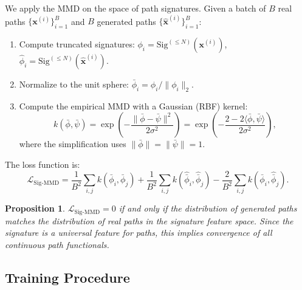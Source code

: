 \documentclass[11pt, a4paper]{article}
\newtheorem{proposition}[theorem]{Proposition}
\newcommand{\Sig}{\mathrm{Sig}}
\begin{document}
We apply the MMD on the space of path signatures. Given a batch of $B$ real paths $\{\mathbf{x}^{(i)}\}_{i=1}^B$ and $B$ generated paths $\{\hat{\mathbf{x}}^{(i)}\}_{i=1}^B$:

\begin{enumerate}[nosep]
    \item Compute truncated signatures: $\phi_i = \Sig^{(\leq N)}(\mathbf{x}^{(i)})$, $\hat{\phi}_i = \Sig^{(\leq N)}(\hat{\mathbf{x}}^{(i)})$.
    \item Normalize to the unit sphere: $\bar{\phi}_i = \phi_i / \|\phi_i\|_2$.  
    \item Compute the empirical MMD with a Gaussian (RBF) kernel:
    \begin{equation}
        k(\bar{\phi}, \bar{\psi}) = \exp\!\left(-\frac{\|\bar{\phi} - \bar{\psi}\|^2}{2\sigma^2}\right) = \exp\!\left(-\frac{2 - 2\langle\bar{\phi}, \bar{\psi}\rangle}{2\sigma^2}\right),
    \end{equation}
    where the simplification uses $\|\bar{\phi}\|=\|\bar{\psi}\|=1$.
\end{enumerate}

The loss function is:
\begin{equation}
    \mathcal{L}_{\text{Sig-MMD}} = \frac{1}{B^2}\sum_{i,j} k(\bar{\phi}_i, \bar{\phi}_j) + \frac{1}{B^2}\sum_{i,j} k(\hat{\bar{\phi}}_i, \hat{\bar{\phi}}_j) - \frac{2}{B^2}\sum_{i,j} k(\bar{\phi}_i, \hat{\bar{\phi}}_j).
\end{equation}

\begin{proposition}
$\mathcal{L}_{\text{Sig-MMD}} = 0$ if and only if the distribution of generated paths matches the distribution of real paths in the signature feature space. Since the signature is a universal feature for paths, this implies convergence of all continuous path functionals.
\end{proposition}

\subsection{Training Procedure}
\end{document}
